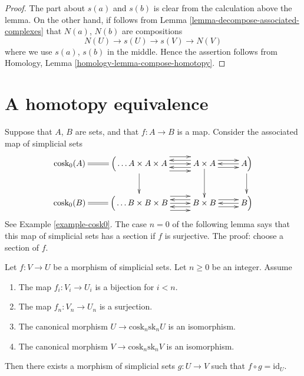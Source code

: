 \begin{proof}
The part about $s(a)$ and $s(b)$ is clear from the calculation
above the lemma. On the other hand, if follows from
Lemma \ref{lemma-decompose-associated-complexes} that
$N(a)$, $N(b)$ are compositions
$$
N(U) \to s(U) \to s(V) \to N(V)
$$
where we use $s(a)$, $s(b)$ in the middle. Hence the assertion
follows from 
Homology, Lemma \ref{homology-lemma-compose-homotopy}.
\end{proof}








\section{A homotopy equivalence}
\label{section-homotopy-equivalence}

\noindent
Suppose that $A$, $B$ are sets, and that $f : A \to B$
is a map. Consider the associated map of
simplicial sets
$$
\xymatrix{
\text{cosk}_0(A) \ar@{=}[r] &
\Big(
\ldots
A\times A \times A
\ar[d]
\ar@<2ex>[r]
\ar@<0ex>[r]
\ar@<-2ex>[r]
&
A \times A
\ar[d]
\ar@<1ex>[r]
\ar@<-1ex>[r]
\ar@<1ex>[l]
\ar@<-1ex>[l]
&
A
\ar[d]
\ar@<0ex>[l]
\Big)
\\
\text{cosk}_0(B) \ar@{=}[r] &
\Big(
\ldots
B\times B \times B
\ar@<2ex>[r]
\ar@<0ex>[r]
\ar@<-2ex>[r]
&
B \times B
\ar@<1ex>[r]
\ar@<-1ex>[r]
\ar@<1ex>[l]
\ar@<-1ex>[l]
&
B
\ar@<0ex>[l]
\Big)
}
$$
See Example \ref{example-cosk0}.
The case $n = 0$ of the following lemma
says that this map of simplicial sets
has a section if $f$ is surjective.
The proof: choose a section of $f$.

\begin{lemma}
\label{lemma-section}
Let $f : V \to U$ be a morphism of simplicial sets.
Let $n \geq 0$ be an integer.
Assume
\begin{enumerate}
\item The map $f_i : V_i \to U_i$ is a bijection for $i < n$.
\item The map $f_n : V_n \to U_n$ is a surjection.
\item The canonical morphism $U \to \text{cosk}_n \text{sk}_n U$
is an isomorphism.
\item The canonical morphism $V \to \text{cosk}_n \text{sk}_n V$
is an isomorphism.
\end{enumerate}
Then there exists a morphism of simplicial sets $g : U \to V$
such that $f \circ g = \text{id}_U$.
\end{lemma}

